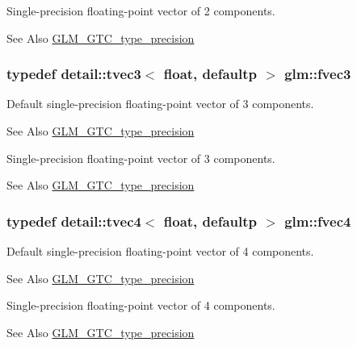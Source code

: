 Single-\/precision floating-\/point vector of 2 components. \begin{DoxySeeAlso}{See Also}
\hyperlink{group__gtc__type__precision}{G\-L\-M\-\_\-\-G\-T\-C\-\_\-type\-\_\-precision} 
\end{DoxySeeAlso}
\hypertarget{group__gtc__type__precision_ga33b85a14a8f68ec99029ff13db6af369}{
\subsubsection[{fvec3}]{\setlength{\rightskip}{0pt plus 5cm}typedef detail\-::tvec3$<$ float, defaultp $>$ {\bf glm\-::fvec3}}}\label{group__gtc__type__precision_ga33b85a14a8f68ec99029ff13db6af369}
Default single-\/precision floating-\/point vector of 3 components. \begin{DoxySeeAlso}{See Also}
\hyperlink{group__gtc__type__precision}{G\-L\-M\-\_\-\-G\-T\-C\-\_\-type\-\_\-precision}
\end{DoxySeeAlso}
Single-\/precision floating-\/point vector of 3 components. \begin{DoxySeeAlso}{See Also}
\hyperlink{group__gtc__type__precision}{G\-L\-M\-\_\-\-G\-T\-C\-\_\-type\-\_\-precision} 
\end{DoxySeeAlso}
\hypertarget{group__gtc__type__precision_ga55d1365630d3b3ecf7c7f4e7c29a9cb1}{
\subsubsection[{fvec4}]{\setlength{\rightskip}{0pt plus 5cm}typedef detail\-::tvec4$<$ float, defaultp $>$ {\bf glm\-::fvec4}}}\label{group__gtc__type__precision_ga55d1365630d3b3ecf7c7f4e7c29a9cb1}
Default single-\/precision floating-\/point vector of 4 components. \begin{DoxySeeAlso}{See Also}
\hyperlink{group__gtc__type__precision}{G\-L\-M\-\_\-\-G\-T\-C\-\_\-type\-\_\-precision}
\end{DoxySeeAlso}
Single-\/precision floating-\/point vector of 4 components. \begin{DoxySeeAlso}{See Also}
\hyperlink{group__gtc__type__precision}{G\-L\-M\-\_\-\-G\-T\-C\-\_\-type\-\_\-precision} 
\end{DoxySeeAlso}
